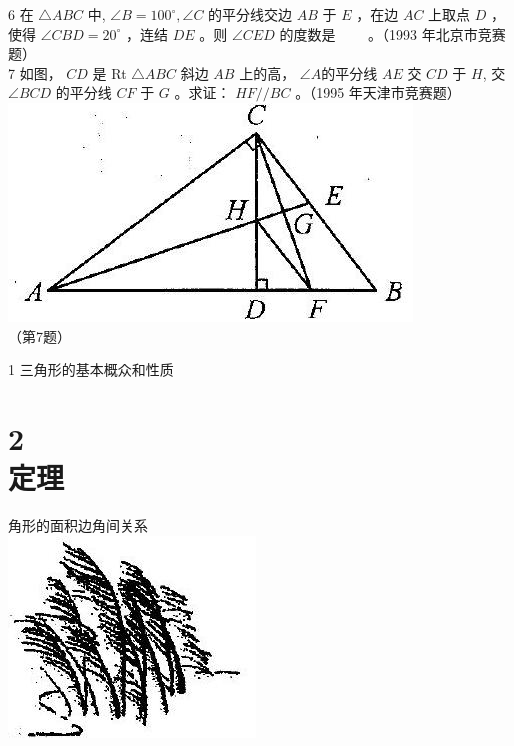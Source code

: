 \documentclass[10pt]{article}
\begin{document}
6 在 $\triangle A B C$ 中, $\angle B=100^{\circ}, \angle C$ 的平分线交边 $A B$ 于 $E$ ，在边 $A C$ 上取点 $D$ ，使得 $\angle C B D=20^{\circ}$ ，连结 $D E$ 。则 $\angle C E D$ 的度数是 $\qquad$。（1993 年北京市竞赛题）\\
7 如图， $C D$ 是 Rt $\triangle A B C$ 斜边 $A B$ 上的高， $\angle A$的平分线 $A E$ 交 $C D$ 于 $H$, 交 $\angle B C D$ 的平分线 $C F$ 于 $G$ 。求证： $H F / / B C$ 。（1995 年天津市竞赛题）\\
\includegraphics[max width=\textwidth, center]{2024_10_30_2c8f45efd4a519b08e1ag-013}\\
（第7题）

1 三角形的基本概众和性质

\section*{2 \\
 定理}
角形的面积边角间关系\\
\includegraphics[max width=\textwidth, center]{2024_10_30_2c8f45efd4a519b08e1ag-014(1)}
\end{document}
